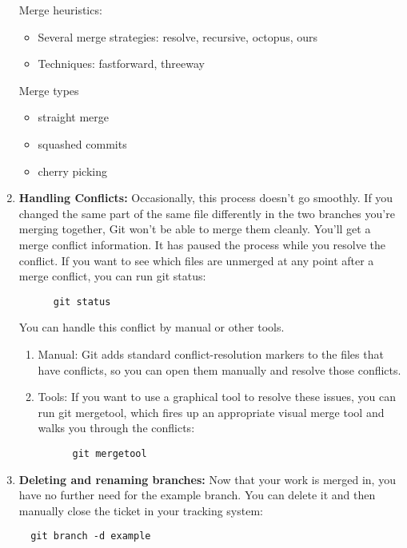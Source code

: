 \documentclass[draftclsnofoot,journal,onecolumn,12pt]{IEEEtran}
\begin{document}
\begin{enumerate}
Merge heuristics:
\begin{itemize}
  \item Several merge strategies: resolve, recursive, octopus, ours
  \item Techniques: fastforward, threeway
\end{itemize}

Merge types
  \begin{itemize}
    \item straight merge
    \item squashed commits
    \item cherry picking
  \end{itemize}
\item \textbf{Handling Conflicts:} Occasionally, this process doesn’t go smoothly. If you changed the same part of the same file differently in the two branches you’re merging together, Git won’t be able to merge them cleanly. You’ll get a merge conflict information.
    It has paused the process while you resolve the conflict. If you want to see which files are unmerged at any point after a merge conflict, you can run git status:
    \begin{verbatim}
      git status
    \end{verbatim}
  You can handle this conflict by manual or other tools.
  \begin{enumerate}
    \item Manual: Git adds standard conflict-resolution markers to the files that have conflicts, so you can open them manually and resolve those conflicts.
    \item Tools: If you want to use a graphical tool to resolve these issues, you can run git mergetool, which fires up an appropriate visual merge tool and walks you through the conflicts:
    \begin{verbatim}
      git mergetool
    \end{verbatim}
  \end{enumerate}
\item \textbf{Deleting and renaming branches:} Now that your work is merged in, you have no further need for the example branch. You can delete it and then manually close the ticket in your tracking system:
\begin{verbatim}
  git branch -d example
\end{verbatim}
\end{enumerate}
\end{document}
